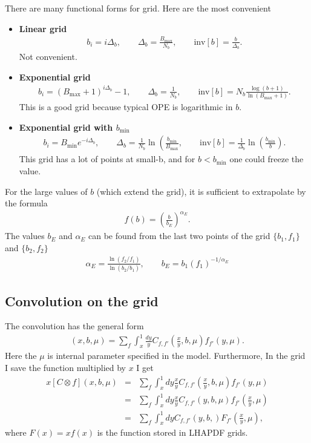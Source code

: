 \documentclass[prd,nofootinbib,eqsecnum,final]{revtex4}
\newcommand{\nn}{\nonumber}
\renewcommand{\(}{\left(}
\renewcommand{\)}{\right)}
\renewcommand{\[}{\left[}
\renewcommand{\]}{\right]}
\begin{document}
There are many functional forms for grid. Here are the most convenient
\begin{itemize}
\item \textbf{Linear grid} 
\begin{eqnarray}
b_i=i\Delta_b,\qquad \Delta_b=\frac{B_{\text{max}}}{N_b},\qquad \text{inv}[b]=\frac{b}{\Delta_b}.
\end{eqnarray}
Not convenient.
\item \textbf{Exponential grid} 
\begin{eqnarray}
b_i=(B_{\text{max}}+1)^{i \Delta_b}-1,\qquad \Delta_b=\frac{1}{N_b},\qquad \text{inv}[b]=N_b\frac{\log(b+1)}{\ln(B_\text{max}+1)}.
\end{eqnarray}
This is a good grid because typical OPE is logarithmic in $b$.

\item \textbf{Exponential grid with $b_{\text{min}}$} 
\begin{eqnarray}
b_i=B_{\text{min}} e^{-i \Delta_b},\qquad \Delta_b=\frac{1}{N_b}\ln\(\frac{b_{\text{min}}}{B_{\text{max}}},\qquad \text{inv}[b]=\frac{1}{\Delta_b}\ln\(\frac{b_{\text{min}}}{b}\).
\end{eqnarray}
This grid has a lot of points at small-b, and for $b<b_\text{min}$ one could freeze the value.
\end{itemize}

For the large values of $b$ (which extend the grid), it is sufficient to extrapolate by the formula
\begin{eqnarray}
f(b)=\(\frac{b}{b_E}\)^{\alpha_E}.
\end{eqnarray}
The values $b_E$ and $\alpha_E$ can be found from the last two points of the grid $\{b_1,f_1\}$ and $\{b_2,f_2\}$
\begin{eqnarray}
\alpha_E=\frac{\ln(f_2/f_1)}{\ln(b_2/b_1)},\qquad b_E=b_1 (f_1)^{-1/\alpha_E}
\end{eqnarray}

\subsection{Convolution on the grid}


The convolution has the general form
\begin{eqnarray}
[C\otimes f](x,b,\mu)=\sum_f\int_x^1 \frac{dy}{y} C_{f,f'}\(\frac{x}{y},b,\mu\)f_{f'}(y,\mu).
\end{eqnarray}
Here the $\mu$ is internal parameter specified in the model. Furthermore, In the grid I save the function multiplied by $x$ I get
\begin{eqnarray}
x[C\otimes f](x,b,\mu)&=&
\sum_f\int_x^1 dy\frac{x}{y} C_{f,f'}\(\frac{x}{y},b,\mu\)f_{f'}(y,\mu)
\\\nn
&=&
\sum_f\int_x^1 dy\frac{x}{y} C_{f,f'}(y,b,\mu)f_{f'}\(\frac{x}{y},\mu\)
\\\nn
&=&
\sum_f\int_x^1 dy C_{f,f'}(y,b,)F_{f'}\(\frac{x}{y},\mu\),
\end{eqnarray}
where $F(x)=xf(x)$ is the function stored in LHAPDF grids.
\end{document}
